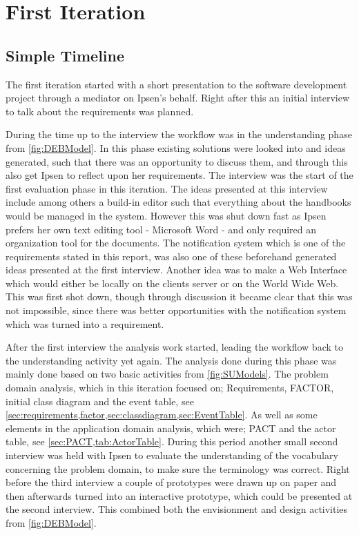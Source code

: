 \section{First Iteration}\label{sec:Iteration1}
\subsection{Simple Timeline}\label{sec:1-simpleTime}
The first iteration started with a short presentation to the software development project through a mediator on Ipsen's behalf.
Right after this an initial interview to talk about the requirements was planned.

During the time up to the interview the workflow was in the understanding phase from \cref{fig:DEBModel}.
In this phase existing solutions were looked into and ideas generated, such that there was an opportunity to discuss them, and through this also get Ipsen to reflect upon her requirements.
The interview was the start of the first evaluation phase in this iteration.
The ideas presented at this interview include among others a build-in editor such that everything about the handbooks would be managed in the system.
However this was shut down fast as Ipsen prefers her own text editing tool - Microsoft Word - and only required an organization tool for the documents.
The notification system which is one of the requirements stated in this report, was also one of these beforehand generated ideas presented at the first interview.
Another idea was to make a Web Interface which would either be locally on the clients server or on the World Wide Web.
This was first shot down, though through discussion it became clear that this was not impossible, since there was better opportunities with the notification system which was turned into a requirement.

After the first interview the analysis work started, leading the workflow back to the understanding activity yet again.
The analysis done during this phase was mainly done based on two basic activities from \cref{fig:SUModels}.
The problem domain analysis, which in this iteration focused on; Requirements, FACTOR, initial class diagram and the event table, see \cref{sec:requirements,factor,sec:classdiagram,sec:EventTable}.
As well as some elements in the application domain analysis, which were; PACT and the actor table, see \cref{sec:PACT,tab:ActorTable}.
During this period another small second interview was held with Ipsen to evaluate the understanding of the vocabulary concerning the problem domain, to make sure the terminology was correct.
Right before the third interview a couple of prototypes were drawn up on paper and then afterwards turned into an interactive prototype, which could be presented at the second interview.
This combined both the envisionment and design activities from \cref{fig:DEBModel}.


